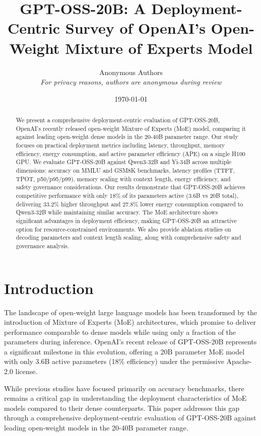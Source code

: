 \documentclass[11pt]{article}
\title{GPT-OSS-20B: A Deployment-Centric Survey of OpenAI's Open-Weight Mixture of Experts Model}
\author{
    Anonymous Authors \\
    \textit{For privacy reasons, authors are anonymous during review}
}
\date{\today}
\begin{document}
\maketitle

\begin{abstract}
We present a comprehensive deployment-centric evaluation of GPT-OSS-20B, OpenAI's recently released open-weight Mixture of Experts (MoE) model, comparing it against leading open-weight dense models in the 20-40B parameter range. Our study focuses on practical deployment metrics including latency, throughput, memory efficiency, energy consumption, and active parameter efficiency (APE) on a single H100 GPU. We evaluate GPT-OSS-20B against Qwen3-32B and Yi-34B across multiple dimensions: accuracy on MMLU and GSM8K benchmarks, latency profiles (TTFT, TPOT, p50/p95/p99), memory scaling with context length, energy efficiency, and safety governance considerations. Our results demonstrate that GPT-OSS-20B achieves competitive performance with only 18\% of its parameters active (3.6B vs 20B total), delivering 33.2\% higher throughput and 27.8\% lower energy consumption compared to Qwen3-32B while maintaining similar accuracy. The MoE architecture shows significant advantages in deployment efficiency, making GPT-OSS-20B an attractive option for resource-constrained environments. We also provide ablation studies on decoding parameters and context length scaling, along with comprehensive safety and governance analysis.
\end{abstract}

\section{Introduction}

The landscape of open-weight large language models has been transformed by the introduction of Mixture of Experts (MoE) architectures, which promise to deliver performance comparable to dense models while using only a fraction of the parameters during inference. OpenAI's recent release of GPT-OSS-20B represents a significant milestone in this evolution, offering a 20B parameter MoE model with only 3.6B active parameters (18\% efficiency) under the permissive Apache-2.0 license.

While previous studies have focused primarily on accuracy benchmarks, there remains a critical gap in understanding the deployment characteristics of MoE models compared to their dense counterparts. This paper addresses this gap through a comprehensive deployment-centric evaluation of GPT-OSS-20B against leading open-weight models in the 20-40B parameter range.
\end{document}
